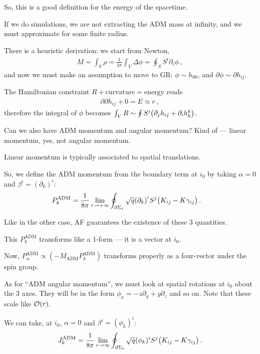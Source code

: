 \documentclass[main.tex]{subfiles}
\begin{document}
So, this is a good definition for the energy of the spacetime. 

If we do simulations, we are not extracting the ADM mass at infinity, and we must approximate for some finite radius. 

There is a heuristic derivation: we start from Newton, 
%
\begin{align}
M = \int_{V} \rho = \frac{1}{4 \pi } \int_{V} \Delta \phi  
= \oint_{S} S^{i} \partial_{i} \phi 
\,,
\end{align}
%
and now we must make an assumption to move to GR: \(\phi \sim h_{00} \), and \(\partial \phi \sim \partial h_{ij}\). 

The Hamiltonian constraint \(R + \text{curvature} = \text{energy}\) reads 
%
\begin{align}
\partial \partial h_{ij} + 0 = E \approx r
\,,
\end{align}
%
therefore the integral of \(\phi \) becomes \(\int_{V} R \sim \oint S^{i} \qty(\partial_{j} h_{ij} + \partial_{i} h^{k}_{k})\). 

Can we also have ADM momentum and angular momentum? 
Kind of --- linear momentum, yes, not angular momentum.

Linear momentum is typically associated to spatial translations. 

So, we define the ADM momentum from the boundary term at \(i_0 \) by taking \(\alpha = 0\) and \(\beta^{i} = (\partial_{k})^{i}\): 
%
\begin{align}
P_k^{\text{ADM}} &= \frac{1}{8 \pi }
\lim_{r \to + \infty } \oint_{ \partial \Sigma _t} \sqrt{q} \qty(\partial_{k})^{i} S^{j} \qty(K_{ij} - K \gamma_{ij}) 
\,.
\end{align}

Like in the other case, AF guarantees the existence of these 3 quantities. 

This \(P_k^{\text{ADM}}\) transforms like a 1-form --- it is a vector at \(i_0 \). 

Now, \(P_\alpha^{\text{ADM}} \propto (- M _{\text{ADM}} P^{\text{ADM}}_{k})\) transforms properly as a four-vector under the spin group. 

As for ``ADM angular momentum'', we must look at spatial rotations at \(i_0 \) about the 3 axes. 
They will be in the form \(\phi _x = - z \partial_{y} + y \partial_{z}\) and so on. Note that these scale like \(\order{r}\). 

We can take, at \(i_0 \), \(\alpha = 0\) and \(\beta^{i} = (\phi _k)^{i}\): 
%
\begin{align}
J_k^{\text{ADM}} = \frac{1}{8 \pi } \lim_{r \to \infty } \oint_{\partial \Sigma _t} \sqrt{q} (\phi_k)^{i} S^{j} \qty(K_{ij} - K \gamma_{ij})
\,.
\end{align}
\end{document}
